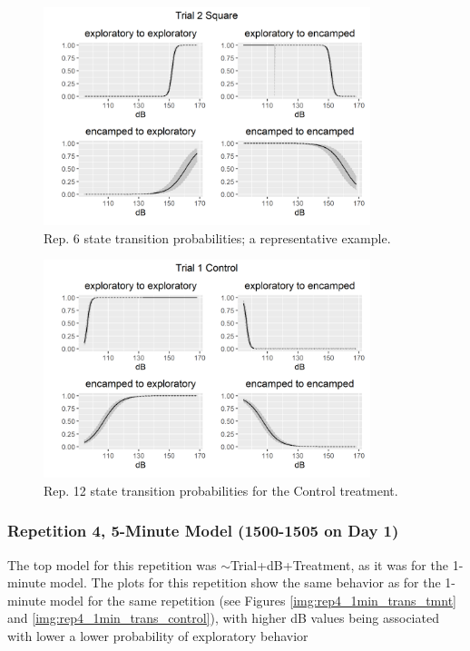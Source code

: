 \documentclass[12pt]{article}
\begin{document}
			\begin{figure}
				\centering
				\includegraphics[width=0.85\textwidth]{trans_rep_12_trial_2_Square.png}
				\caption{Rep. 6 state transition probabilities; a representative example.}
				\label{img:rep12_1min_trans_tmnt}				
			\end{figure}
			
			\begin{figure}
				\centering
				\includegraphics[width=0.85\textwidth]{trans_rep_12_trial_1_Control.png}
				\caption{Rep. 12 state transition probabilities for the Control treatment.}
				\label{img:rep12_1min_trans_control}				
			\end{figure}
		
		\subsubsection{Repetition 4, 5-Minute Model (1500-1505 on Day 1)}
		
			The top model for this repetition was $\sim$Trial+dB+Treatment, as it was for the 1-minute model. The plots for this repetition show the same behavior as for the 1-minute model for the same repetition (see Figures \ref{img:rep4_1min_trans_tmnt} and \ref{img:rep4_1min_trans_control}), with higher dB values being associated with lower a lower probability of exploratory behavior
		
\end{document}
